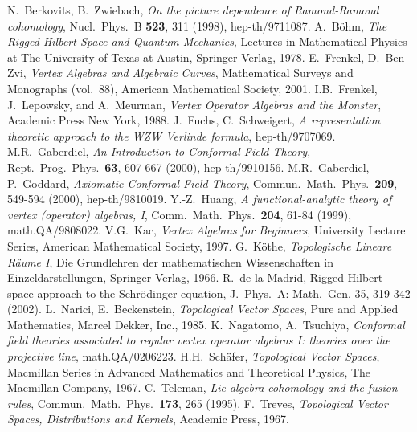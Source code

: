 \documentclass[a4paper,12pt,twoside]{article}
\begin{document}
\begin{thebibliography}{FFK1}
N.\ Berkovits, B.\ Zwiebach, {\it On the picture dependence of Ramond-Ramond
cohomology}, Nucl.\ Phys.\ B {\bf 523}, 311 (1998), hep-th/9711087.
 A.\ B\"{o}hm, {\it The Rigged Hilbert Space and Quantum
Mechanics}, Lectures in Mathematical Physics at The University of Texas at
Austin, Springer-Verlag, 1978.
 E.\ Frenkel, D.\ Ben-Zvi, {\it Vertex Algebras and
Algebraic Curves}, Mathematical Surveys and Monographs (vol.\ 88), American Mathematical Society, 2001.
I.B.\ Frenkel, J.\ Lepowsky, and A.\ Meurman, {\it Vertex Operator Algebras
and the Monster}, Academic Press New York, 1988.
 J.\ Fuchs, C.\ Schweigert, {\it A representation theoretic approach to the WZW Verlinde formula},
hep-th/9707069.
 M.R.\ Gaberdiel, {\it An Introduction to Conformal Field Theory},
Rept.\ Prog.\ Phys.\ {\bf 63}, 607-667 (2000), hep-th/9910156.
 M.R.\ Gaberdiel, P.\ Goddard, {\it Axiomatic Conformal Field
Theory}, Commun.\ Math.\ Phys.\ {\bf 209}, 549-594 (2000), hep-th/9810019.
 Y.-Z.\ Huang, {\it A functional-analytic theory of vertex
(operator) algebras, I}, Comm.\ Math.\ Phys.\ {\bf 204}, 61-84 (1999), math.QA/9808022.
 V.G.\ Kac, {\it Vertex Algebras for Beginners}, University Lecture Series, American Mathematical Society, 1997.
 G.\ K\"{o}the, {\it Topologische Lineare R\"{a}ume
I}, Die Grundlehren der mathemati\-schen Wissenschaften in
Einzeldarstellungen,
Springer-Verlag, 1966.
 R.\ de la Madrid, {Rigged Hilbert space approach to the Schr\"{o}dinger equation},
J.\ Phys.\ A: Math.\ Gen. 35, 319-342 (2002).
 L.\ Narici, E.\ Beckenstein, {\it Topological Vector Spaces},
Pure and Applied Mathematics, Marcel Dekker,
Inc., 1985.
 K.\ Nagatomo, A.\ Tsuchiya, {\it Conformal field theories associated to regular
vertex operator algebras I: theories over the projective line}, math.QA/0206223.
H.H.\ Sch\"{a}fer, {\it Topological Vector Spaces}, Macmillan Series in
Advanced Mathematics and Theoretical Physics,
The Macmillan Company, 1967.
 C.\ Teleman, {\it Lie algebra cohomology and the fusion rules},
Commun.\ Math.\ Phys.\ {\bf 173}, 265 (1995).
F.\ Treves, {\it Topological Vector Spaces, Distributions and
Kernels}, Academic Press, 1967.
\end{thebibliography}
\end{document}
